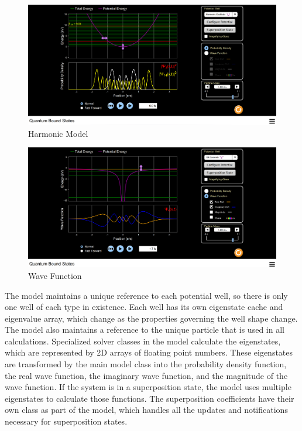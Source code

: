 \begin{figure}[H]
    \centering
    \includegraphics[width=\textwidth]{./img/harmonic_highlight.png}
    \caption{Harmonic Model}
\end{figure}

\begin{figure}[H]
    \centering
    \includegraphics[width=\textwidth]{./img/wavefunction.png}
    \caption{Wave Function}
\end{figure}

The model maintains a unique reference to each potential well, so there is only one well of each
type in existence.  Each well has its own eigenstate cache and eigenvalue array, which change as the
properties governing the well shape change.  The model also maintains a reference to the unique
particle that is used in all calculations.  Specialized solver classes in the model calculate the
eigenstates, which are represented by 2D arrays of floating point numbers.  These eigenstates are
transformed by the main model class into the probability density function, the real wave function,
the imaginary wave function, and the magnitude of the wave function.  If the system is in a
superposition state, the model uses multiple eigenstates to calculate those functions.  The
superposition coefficients have their own class as part of the model, which handles all the updates
and notifications necessary for superposition states.

